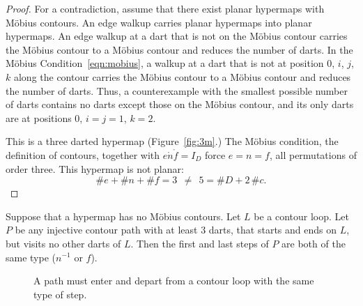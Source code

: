\begin{proof} For a contradiction, assume that there exist planar
hypermaps with M\"obius contours.  An edge walkup carries
planar hypermaps into planar hypermaps. An edge walkup
at a dart that is not on the M\"obius contour carries the
M\"obius contour to a M\"obius contour 
and reduces the number of darts.  
In the M\"obius Condition~\ref{eqn:mobius},
a walkup at a dart that is not at position $0$, $i$, $j$, $k$
along the contour carries the M\"obius contour to a M\"obius contour
and reduces the number of darts. Thus, a counterexample with
the smallest possible number of darts contains no
darts except those on the M\"obius contour, and its only darts
are at positions $0$, $i=j=1$, $k=2$.

This is a three darted hypermap (Figure~\ref{fig:3m}.)  
The M\"obius condition, the
definition of contours, together with $e\ocirc n\ocirc f=I_D$ force
$e=n=f$, all permutations of order three.  This hypermap is not planar:
\begin{displaymath}\# e + \# n + \# f = 3~~\ne~~ 5 = \# D + 2\,
\#c.\end{displaymath}
\end{proof}



%
%

\begin{lemma}
Suppose that a hypermap has no M\"obius contours. Let $L$ be a
contour loop.  Let $P$ be any injective contour path with at least
$3$ darts, that starts and ends on $L$, but visits no other darts of
$L$.  Then the first and last steps of $P$ are both of the same type
($n^{-1}$ or $f$).
\end{lemma}
%

\begin{figure}[htb]
\centering
{}
\caption{A path must enter and depart from a contour loop with the
same type of step.}
\label{fig:interior_nf}
\end{figure}


